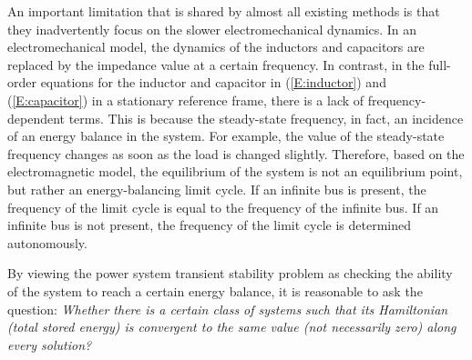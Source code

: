
An important limitation that is shared by almost all existing methods is that they inadvertently focus on the slower electromechanical dynamics. In an electromechanical model, the dynamics of the inductors and capacitors are replaced by the impedance value at a certain frequency. In contrast, in the full-order equations for the inductor and capacitor in (\ref{E:inductor}) and (\ref{E:capacitor}) in a stationary reference frame, there is a lack of frequency-dependent terms. This is because the steady-state frequency, in fact, an incidence of an energy balance in the system. For example, the value of the steady-state frequency changes as soon as the load is changed slightly. Therefore, based on the electromagnetic model, the equilibrium of the system is not an equilibrium point, but rather an energy-balancing limit cycle. If an infinite bus is present, the frequency of the limit cycle is equal to the frequency of the infinite bus. If an infinite bus is not present, the frequency of the limit cycle is determined autonomously.

By viewing the power system transient stability problem as checking the ability of the system to reach a certain energy balance, it is reasonable to ask the question: \emph{Whether there is a certain class of systems such that its Hamiltonian (total stored energy) is convergent to the same value (not necessarily zero) along every solution?}


